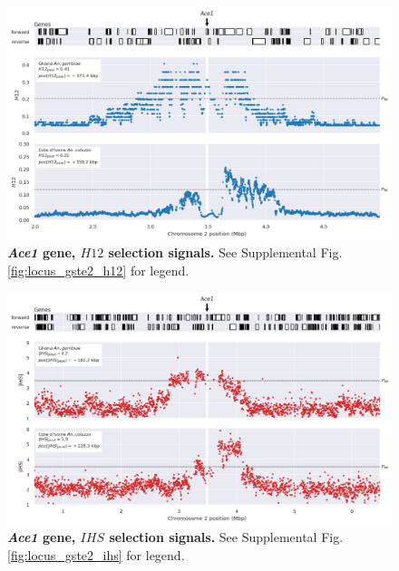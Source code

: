 \documentclass[a4paper,11pt,abstracton,hidelinks]{scrartcl}
\begin{document}
\begin{figure}[t!]
	\begin{center}
		\includegraphics*[width=1\linewidth,center]{artwork/locus_ace1_h12_pdist.png}
	\end{center}
	\caption[\textit{Ace1} gene, $H12$ selection signals]{
	\textbf{\textit{Ace1} gene, $H12$ selection signals.}
	See Supplemental Fig. \ref{fig:locus_gste2_h12} for legend.
	} 
	\label{fig:locus_ace1_h12}
\end{figure}


\clearpage


\begin{figure}[t!]
	\begin{center}
		\includegraphics*[width=1\linewidth,center]{artwork/locus_ace1_ihs_pdist.png}
	\end{center}
	\caption[\textit{Ace1} gene, $IHS$ selection signals]{
	\textbf{\textit{Ace1} gene, $IHS$ selection signals.}
	See Supplemental Fig. \ref{fig:locus_gste2_ihs} for legend.
	} 
	\label{fig:locus_ace1_ihs}
\end{figure}
\end{document}
